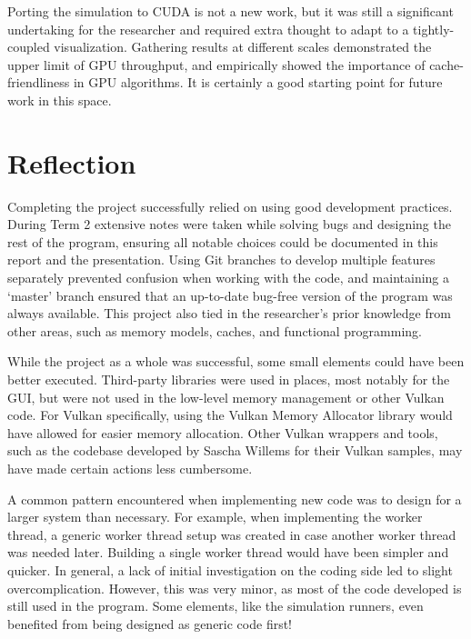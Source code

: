 Porting the simulation to CUDA is not a new work, but it was still a significant undertaking for the researcher and required extra thought to adapt to a tightly-coupled visualization.
Gathering results at different scales demonstrated the upper limit of GPU throughput, and empirically showed the importance of cache-friendliness in GPU algorithms.
It is certainly a good starting point for future work in this space.

\section{Reflection}
Completing the project successfully relied on using good development practices.
During Term 2 extensive notes were taken while solving bugs and designing the rest of the program, ensuring all notable choices could be documented in this report and the presentation.
Using Git branches to develop multiple features separately prevented confusion when working with the code, and maintaining a `master' branch ensured that an up-to-date bug-free version of the program was always available.
This project also tied in the researcher's prior knowledge from other areas, such as memory models, caches, and functional programming.

While the project as a whole was successful, some small elements could have been better executed.
Third-party libraries were used in places, most notably for the GUI, but were not used in the low-level memory management or other Vulkan code.
For Vulkan specifically, using the Vulkan Memory Allocator library\cite{GPUOpenVMA} would have allowed for easier memory allocation.
Other Vulkan wrappers and tools, such as the codebase developed by Sascha Willems for their Vulkan samples\cite{SaschaWillemsVulkan}, may have made certain actions less cumbersome.

A common pattern encountered when implementing new code was to design for a larger system than necessary.
For example, when implementing the worker thread, a generic worker thread setup was created in case another worker thread was needed later.
Building a single worker thread would have been simpler and quicker.
In general, a lack of initial investigation on the coding side led to slight overcomplication.
However, this was very minor, as most of the code developed is still used in the program.
Some elements, like the simulation runners, even benefited from being designed as generic code first!

